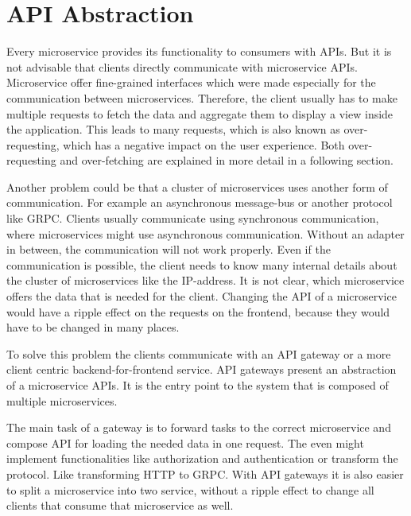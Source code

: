 \section{API Abstraction}\label{section:background:api-abstraction}

Every microservice provides its functionality to consumers with APIs. But it is not advisable that clients directly communicate with microservice APIs. Microservice offer fine-grained interfaces which were made especially for the communication between microservices. Therefore, the client usually has to make multiple requests to fetch the data and aggregate them to display a view inside the application. \cite[69]{book:2021:newman:background:bff:micro-services} This leads to many requests, which is also known as over-requesting, which has a negative impact on the user experience. \cite[254, 257]{book:2018:richardson:background:bff:microservices-patterns} Both over-requesting and over-fetching are explained in more detail in a following section.

\bigskip

\noindent Another problem could be that a cluster of microservices uses another form of communication. For example an asynchronous message-bus or another protocol like GRPC. Clients usually communicate using synchronous communication, where microservices might use asynchronous communication. Without an adapter in between, the communication will not work properly. Even if the communication is possible, the client needs to know many internal details about the cluster of microservices like the IP-address. It is not clear, which microservice offers the data that is needed for the client. Changing the API of a microservice would have a ripple effect on the requests on the frontend, because they would have to be changed in many places. \cite[254-257]{book:2018:richardson:background:bff:microservices-patterns}

\bigskip

\noindent To solve this problem the clients communicate with an API gateway or a more client centric backend-for-frontend service. API gateways present an abstraction of a microservice APIs. It is the entry point to the system that is composed of multiple microservices. \cite[19-20]{book:2020:siriwardena:background:bff:microservice-security-in-action}

\bigskip

\noindent The main task of a gateway is to forward tasks to the correct microservice and compose API for loading the needed data in one request. The even might implement functionalities like authorization and authentication or transform the protocol. Like transforming HTTP to GRPC. With API gateways it is also easier to split a microservice into two service, without a ripple effect to change all clients that consume that microservice as well. \cite[260-263]{book:2018:richardson:background:bff:microservices-patterns}

